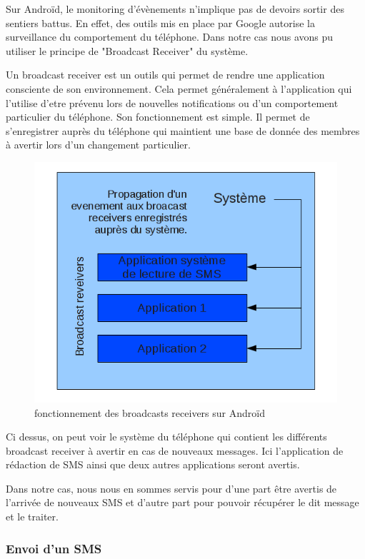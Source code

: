 Sur Androïd, le monitoring d'évènements n'implique pas de devoirs sortir des sentiers battus. En effet,
des outils mis en place par Google autorise la surveillance du comportement du téléphone. Dans notre cas 
nous avons pu utiliser le principe de "Broadcast Receiver" du système. 

Un broadcast receiver est un outils qui permet de rendre une application consciente de son environnement.
Cela permet généralement à l'application qui l'utilise d'etre prévenu lors de nouvelles notifications ou 
d'un comportement particulier du téléphone.
Son fonctionnement est simple. Il permet de s'enregistrer auprès du téléphone qui maintient une base de donnée des 
membres à avertir lors d'un changement particulier.

\begin{figure}[!h]
	\center
	\includegraphics[width=12cm]{img/broadcast-receivers.png}
	\caption{fonctionnement des broadcasts receivers sur Androïd}
\end{figure}

Ci dessus, on peut voir le système du téléphone qui contient les différents broadcast receiver à avertir
en cas de nouveaux messages. Ici l'application de rédaction de SMS ainsi que deux autres applications seront
avertis.

Dans notre cas, nous nous en sommes servis pour d'une part être avertis de l'arrivée de nouveaux SMS et d'autre 
part pour pouvoir récupérer le dit message et le traiter.
\\


\subsubsection{Envoi d'un SMS}

